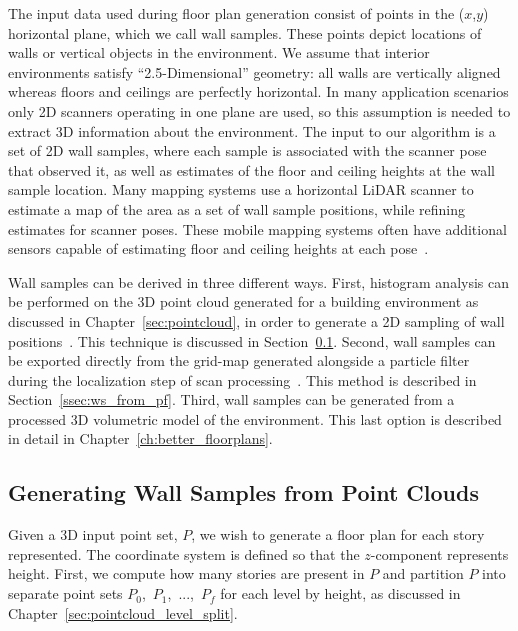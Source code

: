 \documentclass[12pt,onecolumn,oneside]{book}
\begin{document}
The input data used during floor plan generation consist of points in the ($x$,$y$) horizontal plane, which we call wall samples.  These points depict locations of walls or vertical objects in the environment.  We assume that interior environments satisfy ``2.5-Dimensional'' geometry:  all walls are vertically aligned whereas floors and ceilings are perfectly horizontal.  In many application scenarios only 2D scanners operating in one plane are used, so this assumption is needed to extract 3D information about the environment.  The input to our algorithm is a set of 2D wall samples, where each sample is associated with the scanner pose that observed it, as well as estimates of the floor and ceiling heights at the wall sample location.  Many mapping systems use a horizontal LiDAR scanner to estimate a map of the area as a set of wall sample positions, while refining estimates for scanner poses.  These mobile mapping systems often have additional sensors capable of estimating floor and ceiling heights at each pose~\cite{Backpack,Quadrotor}.  

Wall samples can be derived in three different ways.  First, histogram analysis can be performed on the 3D point cloud generated for a building environment as discussed in Chapter~\ref{sec:pointcloud}, in order to generate a 2D sampling of wall positions~\cite{Turner12}.  This technique is discussed in Section~\ref{ssec:ws_from_pc}.  Second, wall samples can be exported directly from the grid-map generated alongside a particle filter during the localization step of scan processing~\cite{NickJournal,Turner14}.  This method is described in Section~\ref{ssec:ws_from_pf}.  Third, wall samples can be generated from a processed 3D volumetric model of the environment.  This last option is described in detail in Chapter~\ref{ch:better_floorplans}.

\subsection{Generating Wall Samples from Point Clouds}
\label{ssec:ws_from_pc}

Given a 3D input point set, $P$, we wish to generate a floor plan for each story represented.  The coordinate system is defined so that the $z$-component represents height.  First, we compute how many stories are present in $P$ and partition $P$ into separate point sets $P_0$,~$P_1$,~...,~$P_f$ for each level by height, as discussed in Chapter~\ref{sec:pointcloud_level_split}.
\end{document}
